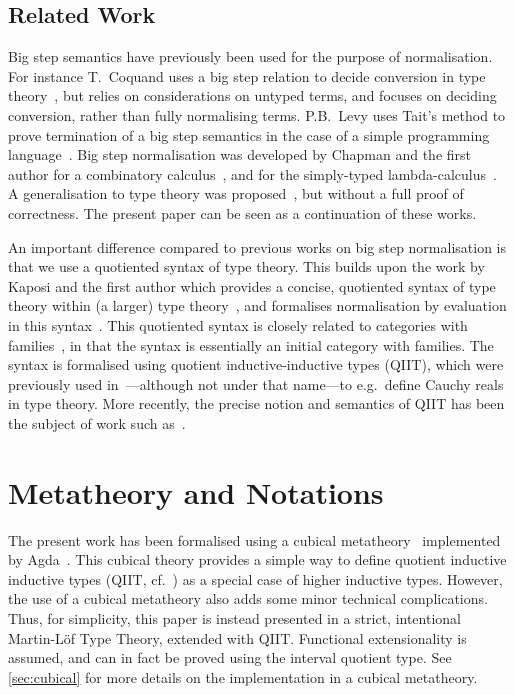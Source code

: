 \documentclass[a4paper,UKenglish,cleveref]{lipics-v2019}
\begin{document}
\subsection{Related Work}
Big step semantics have previously been used for the purpose of normalisation.
For instance T.~Coquand uses a big step relation to decide conversion in type
theory~\cite{coquand1991conversion}, but relies on considerations on untyped
terms, and focuses on deciding conversion, rather than fully normalising terms.
P.B.~Levy uses Tait's method to prove termination of a big step semantics in
the case of a simple programming language~\cite{levy2001call}. Big step
normalisation was developed by Chapman and the first author for a combinatory
calculus~\cite{chapman2006tait}, and for the simply-typed
lambda-calculus~\cite{chapman2009bsn}. A generalisation to type theory was
proposed~\cite{chapman2009type}, but without a full proof of correctness.
The present paper can be seen as a continuation of these works.

An important difference compared to previous works on big step normalisation
is that we use a quotiented syntax of type theory. This builds upon the work by
Kaposi and the first author which provides a concise, quotiented syntax of type
theory within (a larger) type theory~\cite{kaposi2016type}, and formalises
normalisation by evaluation in this syntax~\cite{kaposi2016normalisation}.
This quotiented syntax is closely related to categories with
families~\cite{dybjer1995cwf,hofmann1997syntax}, in that the syntax is
essentially an initial category with families. The syntax is formalised using
quotient inductive-inductive types (QIIT), which were previously used
in~\cite{hott}---although not under that name---to e.g.\ define Cauchy reals
in type theory. More recently, the precise notion and semantics of QIIT has
been the subject of work such
as~\cite{altenkirch2018quotient,dijkstra2017quotient,kaposi2019quotient}.


\section{Metatheory and Notations}
\label{sec:theory}
The present work has been formalised using a cubical metatheory~\cite{cchm}
implemented by Agda~\cite{norell2007agda}. This cubical theory provides a simple
way to define quotient inductive inductive types (QIIT, cf.~\cite{kaposi2016type})
as a special case of higher inductive types. However, the use of a cubical
metatheory also adds some minor technical complications. Thus, for simplicity,
this paper is instead presented in a strict, intentional Martin-Löf Type Theory,
extended with QIIT. Functional extensionality is assumed, and can in fact be
proved using the interval quotient type. See \cref{sec:cubical} for more
details on the implementation in a cubical metatheory.
\end{document}
